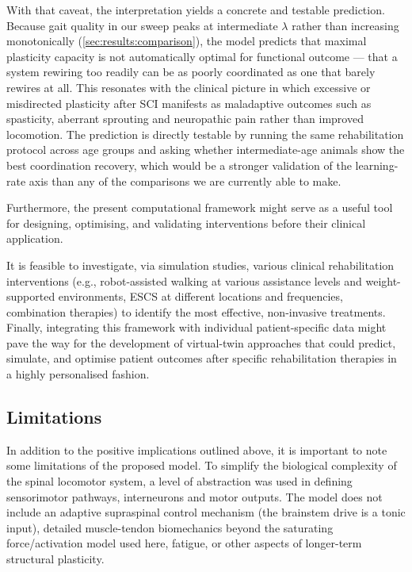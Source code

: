 With that caveat, the interpretation yields a concrete and testable
prediction. Because gait quality in our sweep peaks at intermediate
$\lambda$ rather than increasing monotonically
(\autoref{sec:results:comparison}), the model predicts that maximal
plasticity capacity is not automatically optimal for functional outcome
--- that a system rewiring too readily can be as poorly coordinated as one
that barely rewires at all. This resonates with the clinical picture in
which excessive or misdirected plasticity after SCI manifests as
maladaptive outcomes such as spasticity, aberrant sprouting and
neuropathic pain rather than improved locomotion. The prediction is directly testable by running the
same rehabilitation protocol across age groups and asking whether
intermediate-age animals show the best coordination recovery, which would
be a stronger validation of the learning-rate axis than any of the
comparisons we are currently able to make.

Furthermore, the present computational framework might serve as a useful
tool for designing, optimising, and validating interventions before their
clinical application.

It is feasible to investigate, via simulation studies, various clinical
rehabilitation interventions (e.g., robot-assisted walking at various
assistance levels and weight-supported environments, ESCS at different
locations and frequencies, combination therapies) to identify the most
effective, non-invasive treatments. Finally, integrating this framework
with individual patient-specific data might pave the way for the
development of virtual-twin approaches that could predict, simulate, and
optimise patient outcomes after specific rehabilitation therapies in a
highly personalised fashion.

\subsection{Limitations}
In addition to the positive implications outlined above, it is important
to note some limitations of the proposed model. To simplify the biological
complexity of the spinal locomotor system, a level of abstraction was used
in defining sensorimotor pathways, interneurons and motor outputs. The
model does not include an adaptive supraspinal control mechanism (the
brainstem drive is a tonic input), detailed muscle-tendon
biomechanics beyond the saturating force/activation model used here,
fatigue, or other aspects of longer-term structural plasticity.

